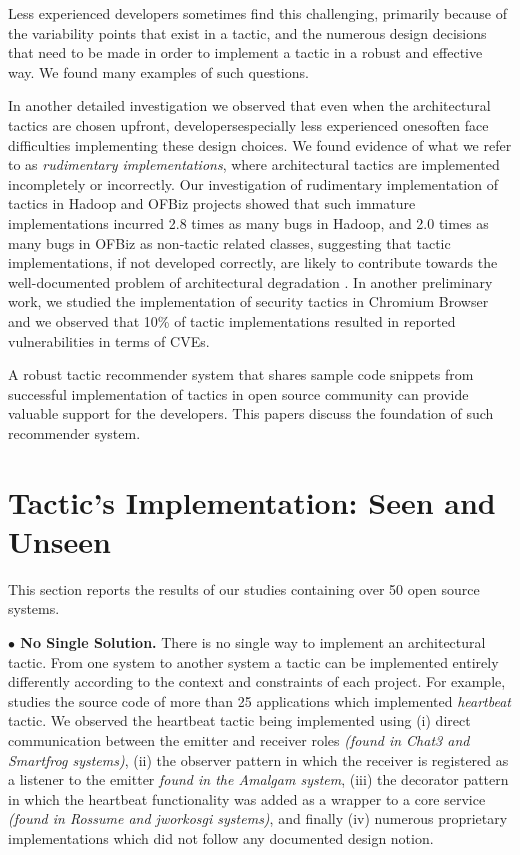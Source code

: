 \documentclass[conference]{IEEEtran}
\begin{document}
Less experienced developers sometimes find this challenging, primarily because of the variability points that exist in a tactic, and the numerous design decisions that need to be made in order to implement a tactic in a robust and effective way. We found many examples of such questions.

In another detailed investigation we observed that even when the architectural tactics are chosen upfront, developers\textemdash especially less experienced ones\textemdash often face difficulties implementing these design choices. We found evidence of what we refer to as \emph{rudimentary implementations}, where architectural tactics are implemented incompletely or incorrectly. Our investigation of rudimentary implementation of tactics in Hadoop and OFBiz projects showed that such immature implementations  incurred 2.8 times as many bugs in Hadoop, and 2.0 times as many bugs in OFBiz as non-tactic related classes, suggesting that tactic implementations, if not developed correctly, are likely to contribute towards the well-documented problem of architectural degradation \cite{Erosion}. In another preliminary work, we studied the implementation of security tactics in Chromium Browser and we observed that 10\% of tactic implementations resulted in reported  vulnerabilities in terms of CVEs.

A robust tactic recommender system that shares sample code snippets from successful implementation of tactics in open source community can provide valuable support for the developers. This papers discuss the foundation of such recommender system.

\section{Tactic's Implementation: Seen and Unseen}
 This section reports the results of our studies containing over 50 open source systems.
 
 
\noindent \textbf{$\bullet$ No Single Solution.}
There is no single way to implement an architectural tactic. From one system to another system a tactic can be implemented entirely differently according to the context and constraints of each project. For example, studies the source code of more than 25 applications which implemented \emph{heartbeat} tactic. We observed the heartbeat tactic being implemented using (i) direct communication between the emitter and receiver roles \emph{(found in Chat3 and Smartfrog systems)}, (ii) the observer pattern in which the receiver is registered as a listener to the emitter \emph{found in the Amalgam system}, (iii) the decorator pattern in which the heartbeat functionality was added as a wrapper to a core service \emph{(found in Rossume and jworkosgi systems)}, and finally (iv) numerous proprietary implementations which did not follow any documented design notion.
\end{document}
